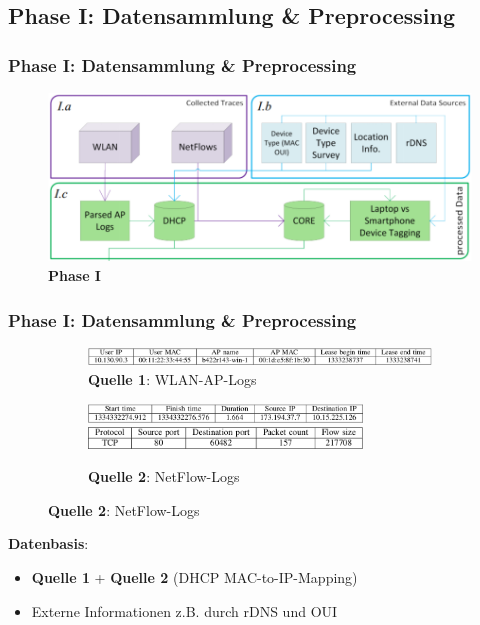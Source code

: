 \documentclass{beamer}
\begin{document}
\subsection{\textbf{Phase I}: Datensammlung \& Preprocessing}

\begin{frame}
  \frametitle{Phase I: Datensammlung \& Preprocessing}
  \begin{figure}
    \centering
    \includegraphics[width=\textwidth]{images/phase1.png}
    \caption*{\textbf{Phase I}}
  \end{figure}  
\end{frame}

\begin{frame}
  \frametitle{Phase I: Datensammlung \& Preprocessing}

  \begin{figure}[H]
    \centering
    \begin{subfigure}[b]{\textwidth}
      \centering
      \includegraphics[width=\textwidth]{images/AP_entry.png}
      \caption*{\textbf{Quelle 1}: WLAN-AP-Logs}
    \end{subfigure}

    \begin{subfigure}[b]{\textwidth}
      \centering
      \includegraphics[width=0.8\textwidth]{images/netflow_entry_p1.png}
      \includegraphics[width=0.8\textwidth]{images/netflow_entry_p2.png}
      \caption*{\textbf{Quelle 2}: NetFlow-Logs}
    \end{subfigure}
  \end{figure}
  
  \textbf{Datenbasis}:
  
  \begin{itemize}
    \item \textbf{Quelle 1} + \textbf{Quelle 2} (DHCP MAC-to-IP-Mapping)
    \item Externe Informationen z.B. durch rDNS und OUI
    
  \end{itemize}
      
\end{frame}
\end{document}
